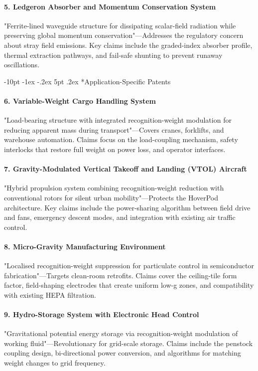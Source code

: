 \documentclass[12pt,letterpaper]{book}
\makeatletter
\renewcommand\section{\@startsection {section}{1}{\z@}%
                {-10pt \@plus -1ex \@minus -.2ex}%
                {5pt \@plus.2ex}%
                {\normalfont\large\bfseries}}
\makeatother
\begin{document}
\paragraph{5. Ledgeron Absorber and Momentum Conservation System}
"Ferrite-lined waveguide structure for dissipating scalar-field radiation while preserving global momentum conservation"—Addresses the regulatory concern about stray field emissions.  Key claims include the graded-index absorber profile, thermal extraction pathways, and fail-safe shunting to prevent runaway oscillations.

\section*{Application-Specific Patents}

\paragraph{6. Variable-Weight Cargo Handling System}
"Load-bearing structure with integrated recognition-weight modulation for reducing apparent mass during transport"—Covers cranes, forklifts, and warehouse automation.  Claims focus on the load-coupling mechanism, safety interlocks that restore full weight on power loss, and operator interfaces.

\paragraph{7. Gravity-Modulated Vertical Takeoff and Landing (VTOL) Aircraft}
"Hybrid propulsion system combining recognition-weight reduction with conventional rotors for silent urban mobility"—Protects the HoverPod architecture.  Key claims include the power-sharing algorithm between field drive and fans, emergency descent modes, and integration with existing air traffic control.

\paragraph{8. Micro-Gravity Manufacturing Environment}
"Localised recognition-weight suppression for particulate control in semiconductor fabrication"—Targets clean-room retrofits.  Claims cover the ceiling-tile form factor, field-shaping electrodes that create uniform low-g zones, and compatibility with existing HEPA filtration.

\paragraph{9. Hydro-Storage System with Electronic Head Control}
"Gravitational potential energy storage via recognition-weight modulation of working fluid"—Revolutionary for grid-scale storage.  Claims include the penstock coupling design, bi-directional power conversion, and algorithms for matching weight changes to grid frequency.
\end{document}
